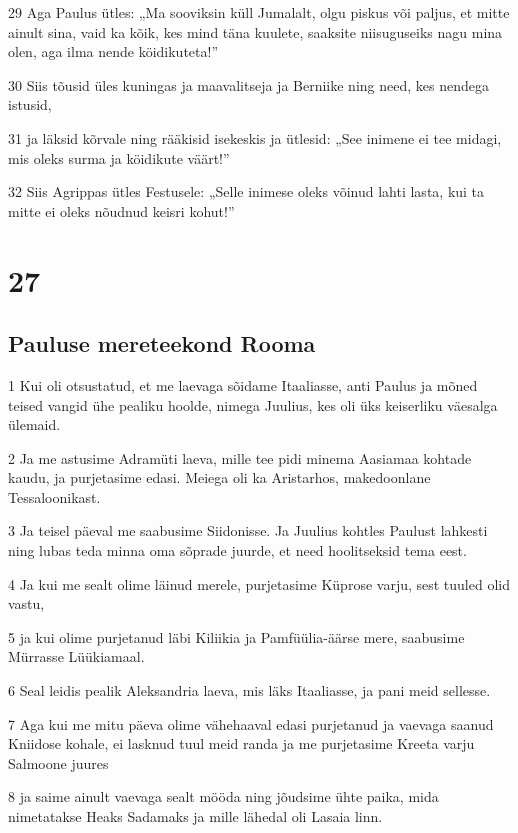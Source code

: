 \par 29 Aga Paulus ütles: „Ma sooviksin küll Jumalalt, olgu piskus või paljus, et mitte ainult sina, vaid ka kõik, kes mind täna kuulete, saaksite niisuguseiks nagu mina olen, aga ilma nende köidikuteta!”
\par 30 Siis tõusid üles kuningas ja maavalitseja ja Berniike ning need, kes nendega istusid,
\par 31 ja läksid kõrvale ning rääkisid isekeskis ja ütlesid: „See inimene ei tee midagi, mis oleks surma ja köidikute väärt!”
\par 32 Siis Agrippas ütles Festusele: „Selle inimese oleks võinud lahti lasta, kui ta mitte ei oleks nõudnud keisri kohut!”

\chapter{27}

\section*{Pauluse mereteekond Rooma}

\par 1 Kui oli otsustatud, et me laevaga sõidame Itaaliasse, anti Paulus ja mõned teised vangid ühe pealiku hoolde, nimega Juulius, kes oli üks keiserliku väesalga ülemaid.
\par 2 Ja me astusime Adramüti laeva, mille tee pidi minema Aasiamaa kohtade kaudu, ja purjetasime edasi. Meiega oli ka Aristarhos, makedoonlane Tessaloonikast.
\par 3 Ja teisel päeval me saabusime Siidonisse. Ja Juulius kohtles Paulust lahkesti ning lubas teda minna oma sõprade juurde, et need hoolitseksid tema eest.
\par 4 Ja kui me sealt olime läinud merele, purjetasime Küprose varju, sest tuuled olid vastu,
\par 5 ja kui olime purjetanud läbi Kiliikia ja Pamfüülia-äärse mere, saabusime Mürrasse Lüükiamaal.
\par 6 Seal leidis pealik Aleksandria laeva, mis läks Itaaliasse, ja pani meid sellesse.
\par 7 Aga kui me mitu päeva olime vähehaaval edasi purjetanud ja vaevaga saanud Kniidose kohale, ei lasknud tuul meid randa ja me purjetasime Kreeta varju Salmoone juures
\par 8 ja saime ainult vaevaga sealt mööda ning jõudsime ühte paika, mida nimetatakse Heaks Sadamaks ja mille lähedal oli Lasaia linn.

